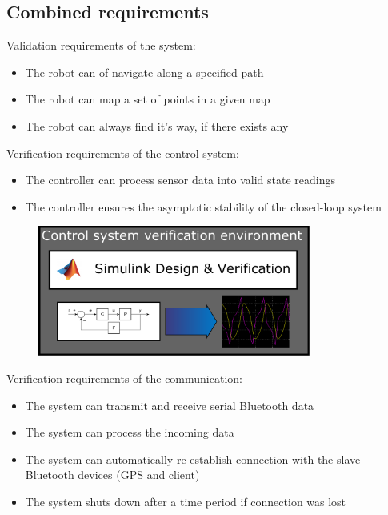 \subsection{Combined requirements}

Validation requirements of the system:

\begin{itemize}

\item The robot can of navigate along a specified path
\item The robot can map a set of points in a given map
\item The robot can always find it’s way, if there exists any

\end{itemize}

Verification requirements of the control system:

\begin{itemize}

\item The controller can process sensor data into valid state readings
\item The controller ensures the asymptotic stability of the closed-loop system 

\end{itemize}

\begin{figure}[H]
	\centering
	\includegraphics[width=0.8\textwidth]{img2/SimVer}
	\caption{}
	\label{}
\end{figure}

Verification requirements of the communication:

\begin{itemize}

\item The system can transmit and receive serial Bluetooth data
\item The system can process the incoming data
\item The system can automatically re-establish connection with the slave Bluetooth devices (GPS and client)
\item The system shuts down after a time period if connection was lost

\end{itemize}

